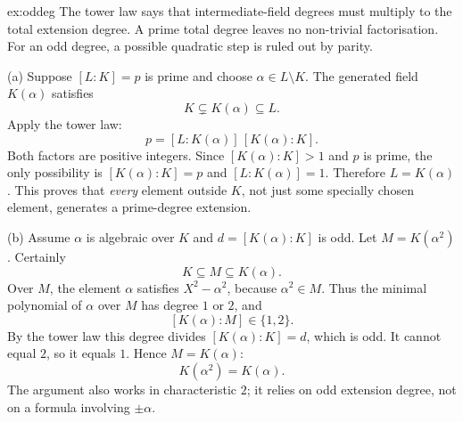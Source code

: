 \begin{solution}{ex:oddeg}
\idea The tower law says that intermediate-field degrees must multiply to the total extension degree. A prime total degree leaves no non-trivial factorisation. For an odd degree, a possible quadratic step is ruled out by parity.

\writeup (a) Suppose $[L:K]=p$ is prime and choose $\alpha\in L\setminus K$. The generated field $K(\alpha)$ satisfies
\[
K\subsetneq K(\alpha)\subseteq L.
\]
Apply the tower law:
\[
p=[L:K(\alpha)]\,[K(\alpha):K].
\]
Both factors are positive integers. Since $[K(\alpha):K]>1$ and $p$ is prime, the only possibility is $[K(\alpha):K]=p$ and $[L:K(\alpha)]=1$. Therefore $L=K(\alpha)$. This proves that \emph{every} element outside $K$, not just some specially chosen element, generates a prime-degree extension.

(b) Assume $\alpha$ is algebraic over $K$ and $d=[K(\alpha):K]$ is odd. Let $M=K(\alpha^2)$. Certainly
\[
K\subseteq M\subseteq K(\alpha).
\]
Over $M$, the element $\alpha$ satisfies $X^2-\alpha^2$, because $\alpha^2\in M$. Thus the minimal polynomial of $\alpha$ over $M$ has degree $1$ or $2$, and
\[
[K(\alpha):M]\in\{1,2\}.
\]
By the tower law this degree divides $[K(\alpha):K]=d$, which is odd. It cannot equal $2$, so it equals $1$. Hence $M=K(\alpha)$:
\[
\boxed{K(\alpha^2)=K(\alpha)}.
\]
The argument also works in characteristic $2$; it relies on odd extension degree, not on a formula involving $\pm\alpha$.
\end{solution}

